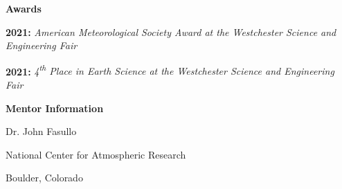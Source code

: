 \documentclass[11pt]{article}
\begin{document}
\begin{center}
\textbf{Awards}
\end{center}

\textbf{2021:} \emph{American Meteorological Society Award at the Westchester Science and Engineering Fair}

\textbf{2021:} \emph{4\textsuperscript{th} Place in Earth Science at the Westchester Science and Engineering Fair}

\begin{center}
\textbf{Mentor Information}

Dr. John Fasullo

National Center for Atmospheric Research

Boulder, Colorado
\end{center}
\end{document}
